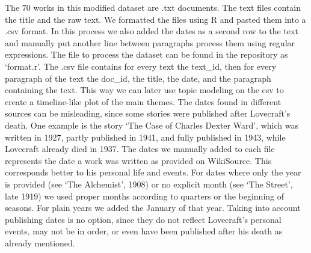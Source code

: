 The 70 works in this modified dataset are .txt documents. The text files contain the 
title and the raw text. We formatted the files using R and pasted them into a .csv 
format. In this process we also added the dates as a second row to the text and manually 
put another line between paragraphs process them using regular expressions. The file to 
process the dataset can be found in the repository as ‘format.r’. The .csv file contains 
for every text the text\_id, then for every paragraph of the text the doc\_id, the title, 
the date, and the paragraph containing the text. This way we can later use topic modeling 
on the csv to create a timeline-like plot of the main themes. The dates found in different 
sources can be misleading, since some stories were published after Lovecraft’s death. 
One example is the story ‘The Case of Charles Dexter Ward’, which was written in 1927, 
partly published in 1941, and fully published in 1943, while Lovecraft already died in 
1937. The dates we manually added to each file represents the date a work was written 
as provided on WikiSource. This corresponds better to his personal life and events. 
For dates where only the year is provided (see ‘The Alchemist’, 1908) or no explicit 
month (see ‘The Street’, late 1919) we used proper months according to quarters or the 
beginning of seasons. For plain years we added the January of that year. Taking into 
account publishing dates is no option, since they do not reflect Lovecraft’s personal 
events, may not be in order, or even have been published after his death as already 
mentioned.